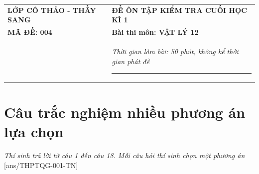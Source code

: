 \begin{tabular}{M{7cm}M{10.5cm}}
	\textbf{LỚP CÔ THẢO - THẦY SANG}& \textbf{ĐỀ ÔN TẬP KIỂM TRA CUỐI HỌC KÌ 1}\\
	\textbf{MÃ ĐỀ: 004}& \textbf{Bài thi môn: VẬT LÝ 12}\\
	& \textit{Thời gian làm bài: 50 phút, không kể thời gian phát đề}
	
	\noindent\rule{4cm}{0.8pt} \\
\end{tabular}
\setcounter{section}{0}
\section{Câu trắc nghiệm nhiều phương án lựa chọn}
\textit{Thí sinh trả lời từ câu 1 đến câu 18. Mỗi câu hỏi thí sinh chọn một phương án}
\setcounter{ex}{0}
[ans/THPTQG-001-TN]

